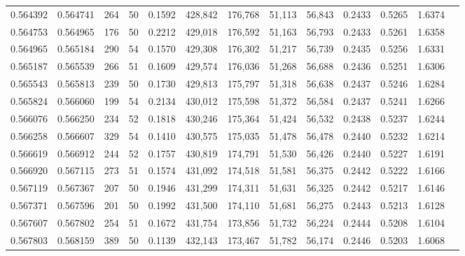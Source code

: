 \begin{tabular}{rrrrrrrrrrrrr}
0.564392 & 0.564741 &   264 &  50 &                                     0.1592 & 428,842 & 176,768 &  51,113 &  56,843 & 0.2433 & 0.5265 & 1.6374 \\
0.564753 & 0.564965 &   176 &  50 &                                     0.2212 & 429,018 & 176,592 &  51,163 &  56,793 & 0.2433 & 0.5261 & 1.6358 \\
0.564965 & 0.565184 &   290 &  54 &                                     0.1570 & 429,308 & 176,302 &  51,217 &  56,739 & 0.2435 & 0.5256 & 1.6331 \\
0.565187 & 0.565539 &   266 &  51 &                                     0.1609 & 429,574 & 176,036 &  51,268 &  56,688 & 0.2436 & 0.5251 & 1.6306 \\
0.565543 & 0.565813 &   239 &  50 &                                     0.1730 & 429,813 & 175,797 &  51,318 &  56,638 & 0.2437 & 0.5246 & 1.6284 \\
0.565824 & 0.566060 &   199 &  54 &                                     0.2134 & 430,012 & 175,598 &  51,372 &  56,584 & 0.2437 & 0.5241 & 1.6266 \\
0.566076 & 0.566250 &   234 &  52 &                                     0.1818 & 430,246 & 175,364 &  51,424 &  56,532 & 0.2438 & 0.5237 & 1.6244 \\
0.566258 & 0.566607 &   329 &  54 &                                     0.1410 & 430,575 & 175,035 &  51,478 &  56,478 & 0.2440 & 0.5232 & 1.6214 \\
0.566619 & 0.566912 &   244 &  52 &                                     0.1757 & 430,819 & 174,791 &  51,530 &  56,426 & 0.2440 & 0.5227 & 1.6191 \\
0.566920 & 0.567115 &   273 &  51 &                                     0.1574 & 431,092 & 174,518 &  51,581 &  56,375 & 0.2442 & 0.5222 & 1.6166 \\
0.567119 & 0.567367 &   207 &  50 &                                     0.1946 & 431,299 & 174,311 &  51,631 &  56,325 & 0.2442 & 0.5217 & 1.6146 \\
0.567371 & 0.567596 &   201 &  50 &                                     0.1992 & 431,500 & 174,110 &  51,681 &  56,275 & 0.2443 & 0.5213 & 1.6128 \\
0.567607 & 0.567802 &   254 &  51 &                                     0.1672 & 431,754 & 173,856 &  51,732 &  56,224 & 0.2444 & 0.5208 & 1.6104 \\
0.567803 & 0.568159 &   389 &  50 &                                     0.1139 & 432,143 & 173,467 &  51,782 &  56,174 & 0.2446 & 0.5203 & 1.6068 \\

\end{tabular}
